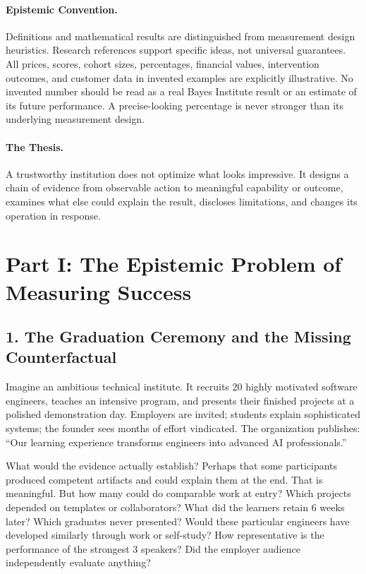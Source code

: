 \paragraph*{Epistemic Convention.} Definitions and mathematical results are distinguished from measurement design heuristics. Research references support specific ideas, not universal guarantees. All prices, scores, cohort sizes, percentages, financial values, intervention outcomes, and customer data in invented examples are explicitly illustrative. No invented number should be read as a real Bayes Institute result or an estimate of its future performance. A precise-looking percentage is never stronger than its underlying measurement design.

\paragraph*{The Thesis.} A trustworthy institution does not optimize what looks impressive. It designs a chain of evidence from observable action to meaningful capability or outcome, examines what else could explain the result, discloses limitations, and changes its operation in response.

\section*{Part I: The Epistemic Problem of Measuring Success}

\subsection*{1. The Graduation Ceremony and the Missing Counterfactual}

Imagine an ambitious technical institute. It recruits 20 highly motivated software engineers, teaches an intensive program, and presents their finished projects at a polished demonstration day. Employers are invited; students explain sophisticated systems; the founder sees months of effort vindicated. The organization publishes: ``Our learning experience transforms engineers into advanced AI professionals.''

What would the evidence actually establish? Perhaps that some participants produced competent artifacts and could explain them at the end. That is meaningful. But how many could do comparable work at entry? Which projects depended on templates or collaborators? What did the learners retain 6 weeks later? Which graduates never presented? Would these particular engineers have developed similarly through work or self-study? How representative is the performance of the strongest 3 speakers? Did the employer audience independently evaluate anything?

